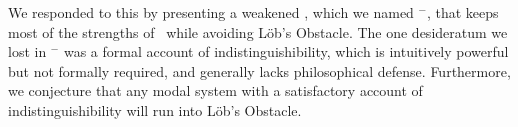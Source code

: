 We responded to this by presenting a weakened \DASL, which we named \DASL$^-$, that keeps most of the strengths of \DASL\ while avoiding L\"ob's Obstacle. The one desideratum we lost in \DASL$^-$ was a formal account of indistinguishibility, which is intuitively powerful but not formally required, and generally lacks philosophical defense. Furthermore, we conjecture that any modal system with a satisfactory account of indistinguishibility will run into L\"ob's Obstacle.


